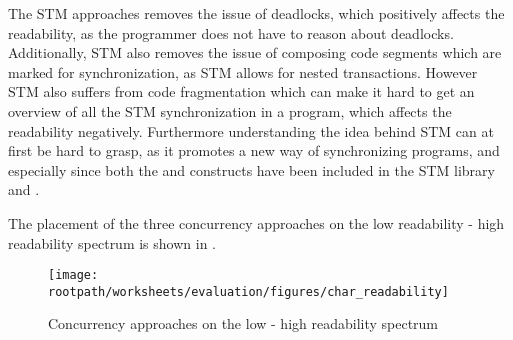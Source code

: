 The \ac{STM} approaches removes the issue of deadlocks, which positively affects the readability, as the programmer does not have to reason about deadlocks. Additionally, \ac{STM} also removes the issue of composing code segments which are marked for synchronization, as \ac{STM} allows for nested transactions. However \ac{STM} also suffers from code fragmentation which can make it hard to get an overview of all the \ac{STM} synchronization in a program, which affects the readability negatively. Furthermore understanding the idea behind \ac{STM} can at first be hard to grasp, as it promotes a new way of synchronizing programs, and especially since both the  and  constructs have been included in the \ac{STM} library and \stmname.



The placement of the three concurrency approaches on the low readability - high readability spectrum is shown in .

\begin{figure}[htbp]
\centering
 \texttt{[image: \\rootpath/worksheets/evaluation/figures/char\_readability]} 
 \caption{Concurrency approaches on the low - high readability spectrum}
\label{fig:char_readability}
\end{figure}

